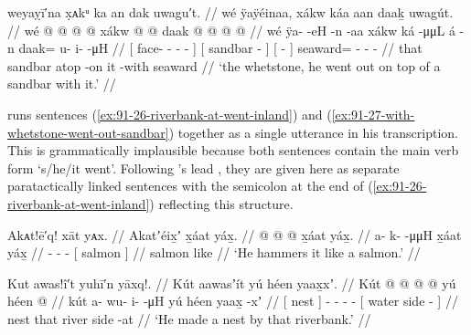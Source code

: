 \ex\label{ex:91-27-with-whetstone-went-out-sandbar}%
%
\begingl
	\glpreamble	weyaỵī′na x̣ᴀkᵘ ka an dak uwagu′t. //
	\glpreamble	wé ÿaÿéinaa, xákw káa aan daaḵ uwagút. //
	\gla	{} wé  @ {} @ {} @ {} @ {} {}
		{} xákw  @ {} {}
		{}  @ {} {}
		daak @  @ {} @ {} @ {} //
	\glb	{} wé ÿa-  -eH -n -aa {}
		{} xákw ká -μμL {}
		{} á -n {}
		daak= u- i-  -μH //
	\glc	{}[  face-  - - - {}]
		{}[ sandbar  - {}]
		{}[  - {}]
		seaward= - -  - //
	\gld	{} that  {} {} {} {} {}
		{} sandbar atop -on {}
		{} it -with {}
		seaward\•  {} {} {} //
	\glft	‘the whetstone, he went out on top of a sandbar with it.’
		//
\endgl
\xe

\citeauthor{swanton:1909} runs sentences (\ref{ex:91-26-riverbank-at-went-inland}) and (\ref{ex:91-27-with-whetstone-went-out-sandbar}) together as a single utterance in his transcription.
This is grammatically implausible because both sentences contain the main verb form  ‘s/he/it went’.
Following \citeauthor{leer:1977}’s lead \parencite[17]{leer:1977}, they are given here as separate paratactically linked sentences with the semicolon at the end of (\ref{ex:91-26-riverbank-at-went-inland}) reflecting this structure.

\ex\label{ex:91-28-hammers-like-salmon}%
%
\begingl
	\glpreamble	Akᴀt!ē′q! xāt yᴀx. //
	\glpreamble	Akatʼéix̱ʼ x̱áat yáx̱. //
	\gla	{} @ {} @ {} @ {}
		{} x̱áat yáx̱. {} //
	\glb	a- k-  -μμH
		{} x̱áat yáx̱ {} //
	\glc	{}- -  -
		{}[ salmon  {}] //
	\gld	{} {} {} {}
		{} salmon like {} //
	\glft	‘He hammers it like a salmon.’
		//
\endgl
\xe

\ex\label{ex:91-29-made-nest}%
%
\begingl
	\glpreamble	Kut awas!î′t yuhī′n yāxq!. //
	\glpreamble	Kút aawasʼít yú héen yaax̱xʼ.  //
	\gla	{} Kút {}  @ {} @ {} @ {} @ {}
		{} yú héen  @ {} {}//
	\glb	{} kút {} a- wu- i-  -μH
		{} yú héen yaax̱ -xʼ {} //
	\glc	{}[ nest {}] - - -  -
		{}[  water side - {}] //
	\gld	{} nest {}  {} {} {} {}
		{} that river side -at {} //
	\glft	‘He made a nest by that riverbank.’
		//
\endgl
\xe

